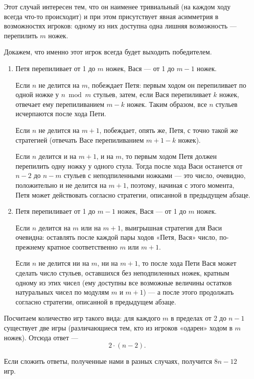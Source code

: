 \begin{itemize}
Этот случай интересен тем, что он наименее тривиальный (на каждом ходу
всегда что-то происходит) и при этом присутствует явная асимметрия
в возможностях игроков: одному из них доступна одна лишняя возможность —
перепилить $m$ ножек.

Докажем, что именно этот игрок всегда будет выходить победителем.

\begin{enumerate}[label={\bfseries\arabic*)}]

	\item Петя перепиливает от 1 до $m$ ножек, Вася — от 1 до $m-1$ ножек.
	
	Если $n$ не делится на $m$, побеждает Петя: первым ходом он перепиливает
	по одной ножке у $n \bmod m$ стульев, затем, если Вася перепиливает
	$k$ ножек, отвечает ему перепиливанием $m-k$ ножек. Таким образом,
	все $n$ стульев исчерпаются после хода Пети.
	
	Если $n$ не делится на $m+1$, побеждает, опять же, Петя, с точно
	такой же стратегией (отвечать Васе перепиливанием $m+1-k$ ножек).
	
	Если $n$ делится и на $m+1$, и на $m$, то первым ходом Петя должен перепилить
	одну ножку у одного стула. Тогда после хода Васи останется от $n - 2$ до $n - m$
	стульев с неподпиленными ножками — это число, очевидно, положительно и
	не делится на $m+1$, поэтому, начиная с этого момента, Петя может действовать
	согласно стратегии, описанной в предыдущем абзаце.
	
	\item Петя перепиливает от 1 до $m-1$ ножек, Вася — от 1 до $m$ ножек.
	
	Если $n$ делится на $m$ или на $m+1$, выигрышная стратегия для Васи очевидна:
	оставлять после каждой пары ходов «Петя, Вася» число, по-прежнему
	кратное соответственно $m$ или $m+1$.
	
	Если $n$ не делится ни на $m$, ни на $m+1$, то после хода Пети Вася может сделать
	число стульев, оставшихся без неподпиленных ножек, кратным одному из этих чисел
	(ему доступны все возможные величины остатков натуральных чисел по модулям $m$
	и $m+1$) — а после этого продолжать согласно стратегии, описанной в предыдущем абзаце.

\end{enumerate}

Посчитаем количество игр такого вида: для каждого $m$ в пределах от 2 до $n-1$ существует
две игры (различающиеся тем, кто из игроков «одарен» ходом в $m$ ножек). Отсюда ответ —
	$$2 \cdot (n-2).$$

Если сложить ответы, полученные нами в разных случаях, получится $8n-12$ игр.

\end{itemize}